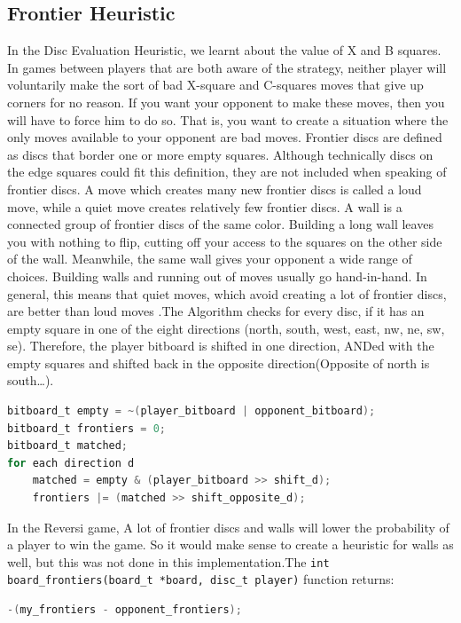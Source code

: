 \subsection{Frontier Heuristic}
In the Disc Evaluation Heuristic, we learnt about the value of X and B squares. In games between players that are both aware of the strategy, neither player will voluntarily make the sort of bad X-square and C-squares moves that give up corners for no reason. If you want your opponent to make these moves, then you will have to force him to do so. That is, you want to create a situation where the only moves available to your opponent are bad moves. \newline Frontier discs are defined as discs that border one or more empty squares. Although technically discs on the edge squares could fit this definition, they are not included when speaking of frontier discs. A move which creates many new frontier discs is called a loud move, while a quiet move creates relatively few frontier discs. A wall is a connected group of frontier discs of the same color. \newline Building a long wall leaves you with nothing to flip, cutting off your access to the squares on the other side of the wall. Meanwhile, the same wall gives your opponent a wide range of choices. Building walls and running out of moves usually go hand-in-hand.
In general, this means that quiet moves, which avoid creating a lot of frontier discs, are better than loud moves \cite{BrianRose}.\newline \newline The Algorithm checks for every disc, if it has an empty square in one of the eight directions (north, south, west, east, nw, ne, sw, se). Therefore, the player bitboard is shifted in one direction, ANDed with the empty squares and shifted back in the opposite direction(Opposite of north is south…).
\begin{lstlisting}[language=c]
bitboard_t empty = ~(player_bitboard | opponent_bitboard);
bitboard_t frontiers = 0;
bitboard_t matched;
for each direction d
	matched = empty & (player_bitboard >> shift_d);
	frontiers |= (matched >> shift_opposite_d);
\end{lstlisting}
In the Reversi game, A lot of frontier discs and walls will lower the probability of a player to win the game. So it would make sense to create a heuristic for walls as well, but this was not done in this implementation.\newline The \verb|int board_frontiers(board_t *board, disc_t player)| function returns:
\begin{lstlisting}[language=c]
-(my_frontiers - opponent_frontiers);
\end{lstlisting}
\newpage
